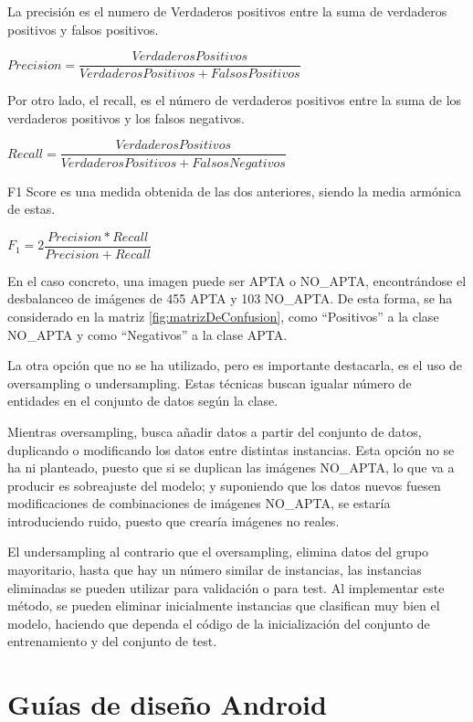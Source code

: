 La precisión es el numero de Verdaderos positivos entre la suma de verdaderos positivos y falsos positivos.
\begin{center}
    $Precision = \dfrac{Verdaderos Positivos} {Verdaderos Positivos + Falsos Positivos} $
\end{center}

Por otro lado, el recall, es el número de verdaderos positivos entre la suma de los verdaderos positivos y los falsos negativos.
\begin{center}
    $Recall = \dfrac{Verdaderos Positivos} {Verdaderos Positivos + Falsos Negativos} $
\end{center}

F1 Score es una medida obtenida de las dos anteriores, siendo la media armónica de estas.
\begin{center}
    $F_1 = 2 \dfrac{Precision * Recall} {Precision + Recall} $
\end{center}

En el caso concreto, una imagen puede ser APTA o NO\_APTA, encontrándose el desbalanceo de imágenes de 455 APTA y 103 NO\_APTA. De esta forma, se ha considerado en la matriz \ref{fig:matrizDeConfusion}, como ``Positivos'' a la clase NO\_APTA y como ``Negativos'' a la clase APTA.

La otra opción que no se ha utilizado, pero es importante destacarla, es el uso de oversampling o undersampling. Estas técnicas buscan igualar número de entidades en el conjunto de datos según la clase. 

Mientras oversampling, busca añadir datos a partir del conjunto de datos, duplicando o modificando los datos entre distintas instancias. Esta opción no se ha ni planteado, puesto que si se duplican las imágenes NO\_APTA, lo que va a producir es sobreajuste del modelo; y suponiendo que los datos nuevos fuesen modificaciones de combinaciones de imágenes  NO\_APTA, se estaría introduciendo ruido, puesto que crearía imágenes no reales.

El undersampling al contrario que el oversampling, elimina datos del grupo mayoritario, hasta que hay un número similar de instancias, las instancias eliminadas se pueden utilizar para validación o para test. Al implementar este método, se pueden eliminar inicialmente instancias que clasifican muy bien el modelo, haciendo que dependa el código de la inicialización del conjunto de entrenamiento y del conjunto de test.

\section{Guías de diseño Android}

